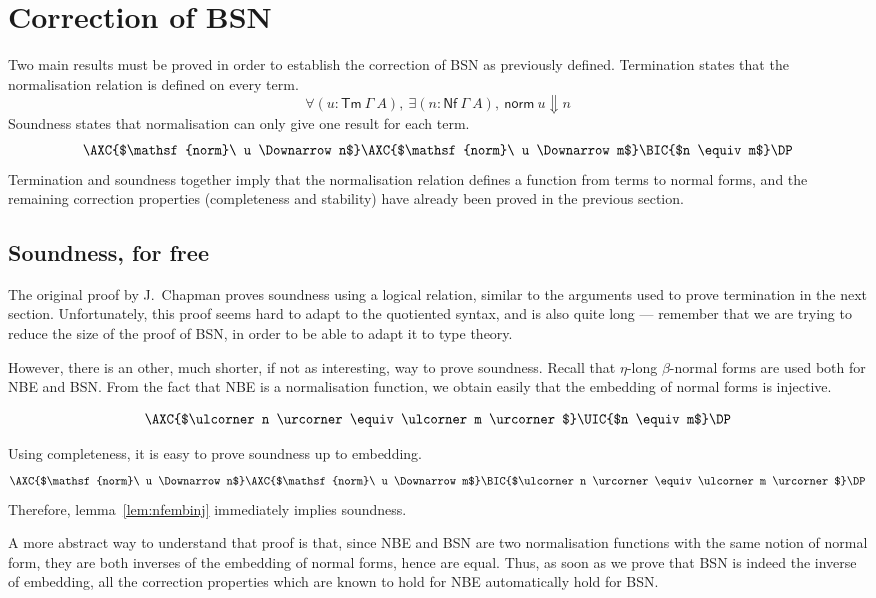 \documentclass[a4paper,english,cleveref,autoref,draft]{lipics-v2019}
\newcommand{\agdaSymb}[1]{\mathsf{#1}}
\newcommand{\Tm}{\agdaSymb{Tm}}
\newcommand{\Nf}{\agdaSymb{Nf}}
\newcommand{\norm}{\agdaSymb{norm}}
\newcommand{\cul}{\ulcorner}
\newcommand{\cur}{\urcorner}
\newcommand{\Da}{\Downarrow}
\begin{document}
\section{Correction of BSN}
Two main results must be proved in order to establish the correction of BSN as
previously defined.
Termination states that the normalisation relation is defined on every term.
\[ \forall (u : \Tm\ \Gamma\ A),\ \exists (n : \Nf\ \Gamma\ A),\ \norm\ u \Da n \]
Soundness states that normalisation can only give one result for each term.
\[
  \AXC{$\norm\ u \Da n$}
  \AXC{$\norm\ u \Da m$}
  \BIC{$n \equiv m$}
  \DP
\]
Termination and soundness together imply that the normalisation relation defines
a function from terms to normal forms, and the remaining correction properties
(completeness and stability) have already been proved in the previous section.

\subsection{Soundness, for free}
The original proof by J.~Chapman proves soundness using a logical relation,
similar to the arguments used to prove termination in the next section.
Unfortunately, this proof seems hard to adapt to the quotiented syntax, and
is also quite long --- remember that we are trying to reduce the size of the
proof of BSN, in order to be able to adapt it to type theory.

However, there is an other, much shorter, if not as interesting, way to prove
soundness. Recall that $\eta$-long $\beta$-normal forms are used both for NBE
and BSN. From the fact that NBE is a normalisation function, we obtain easily
that the embedding of normal forms is injective.
\begin{lemma}
  \label{lem:nfembinj}
  \[
    \AXC{$\cul n \cur \equiv \cul m \cur$}
    \UIC{$n \equiv m$}
    \DP
  \]
\end{lemma}
Using completeness, it is easy to prove soundness up to embedding.
\[
  \AXC{$\norm\ u \Da n$}
  \AXC{$\norm\ u \Da m$}
  \BIC{$\cul n \cur \equiv \cul m \cur$}
  \DP
\]
Therefore, lemma~\ref{lem:nfembinj} immediately implies soundness.

A more abstract way to understand that proof is that, since NBE and BSN are two
normalisation functions with the same notion of normal form, they are both
inverses of the embedding of normal forms, hence are equal. Thus, as soon as we
prove that BSN is indeed the inverse of embedding, all the correction properties
which are known to hold for NBE automatically hold for BSN.
\end{document}
